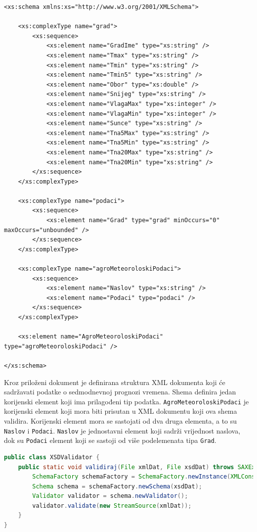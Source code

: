 \documentclass{foi}
\begin{document}
\begin{lstlisting}[caption={Primjer XSD dokumenta za sedmodnevnu prognozu vremena}]
<xs:schema xmlns:xs="http://www.w3.org/2001/XMLSchema">

    <xs:complexType name="grad">
        <xs:sequence>
            <xs:element name="GradIme" type="xs:string" />
            <xs:element name="Tmax" type="xs:string" />
            <xs:element name="Tmin" type="xs:string" />
            <xs:element name="Tmin5" type="xs:string" />
            <xs:element name="Obor" type="xs:double" />
            <xs:element name="Snijeg" type="xs:string" />
            <xs:element name="VlagaMax" type="xs:integer" />
            <xs:element name="VlagaMin" type="xs:integer" />
            <xs:element name="Sunce" type="xs:string" />
            <xs:element name="Tna5Max" type="xs:string" />
            <xs:element name="Tna5Min" type="xs:string" />
            <xs:element name="Tna20Max" type="xs:string" />
            <xs:element name="Tna20Min" type="xs:string" />
        </xs:sequence>
    </xs:complexType>

    <xs:complexType name="podaci">
        <xs:sequence>
            <xs:element name="Grad" type="grad" minOccurs="0" maxOccurs="unbounded" />
        </xs:sequence>
    </xs:complexType>

    <xs:complexType name="agroMeteoroloskiPodaci">
        <xs:sequence>
            <xs:element name="Naslov" type="xs:string" />
            <xs:element name="Podaci" type="podaci" />
        </xs:sequence>
    </xs:complexType>

    <xs:element name="AgroMeteoroloskiPodaci" type="agroMeteoroloskiPodaci" />

</xs:schema>
\end{lstlisting}

Kroz priloženi dokument je definirana struktura XML dokumenta koji će sadržavati podatke
o sedmodnevnoj prognozi vremena. Shema definira jedan korijenski element koji ima prilagođeni tip podatka.
\texttt{AgroMeteoroloskiPodaci} je korijenski element koji mora biti prisutan u XML dokumentu
koji ova shema validira. Korijenski element mora se sastojati od dva druga elementa, a to su
\texttt{Naslov} i \texttt{Podaci}. \texttt{Naslov} je jednostavni element koji sadrži vrijednost
naslova, dok su \texttt{Podaci} element koji se sastoji od više podelemenata tipa \texttt{Grad}.

\begin{lstlisting}[language=java, caption={Klasa za validaciju XML datoteke prema XSD shemi}]
public class XSDValidator {
    public static void validiraj(File xmlDat, File xsdDat) throws SAXException, IOException {
        SchemaFactory schemaFactory = SchemaFactory.newInstance(XMLConstants.W3C_XML_SCHEMA_NS_URI);
        Schema schema = schemaFactory.newSchema(xsdDat);
        Validator validator = schema.newValidator();
        validator.validate(new StreamSource(xmlDat));
    }
}
\end{lstlisting}
\end{document}
